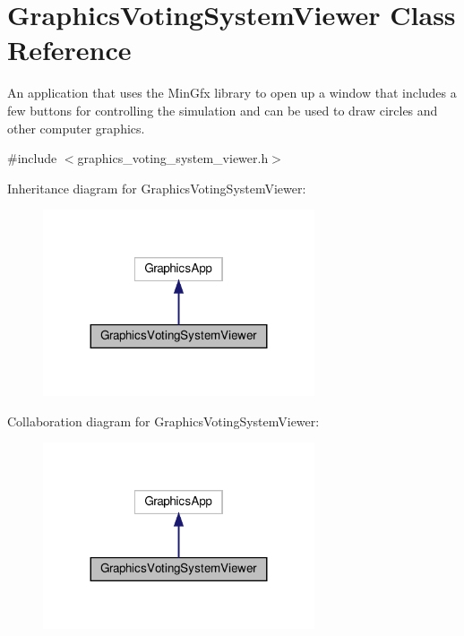 \hypertarget{classGraphicsVotingSystemViewer}{}\section{Graphics\+Voting\+System\+Viewer Class Reference}
\label{classGraphicsVotingSystemViewer}


An application that uses the Min\+Gfx library to open up a window that includes a few buttons for controlling the simulation and can be used to draw circles and other computer graphics.  




{\ttfamily \#include $<$graphics\+\_\+voting\+\_\+system\+\_\+viewer.\+h$>$}



Inheritance diagram for Graphics\+Voting\+System\+Viewer\+:
\nopagebreak
\begin{figure}[H]
\begin{center}
\leavevmode
\includegraphics[width=227pt]{classGraphicsVotingSystemViewer__inherit__graph}
\end{center}
\end{figure}


Collaboration diagram for Graphics\+Voting\+System\+Viewer\+:
\nopagebreak
\begin{figure}[H]
\begin{center}
\leavevmode
\includegraphics[width=227pt]{classGraphicsVotingSystemViewer__coll__graph}
\end{center}
\end{figure}
